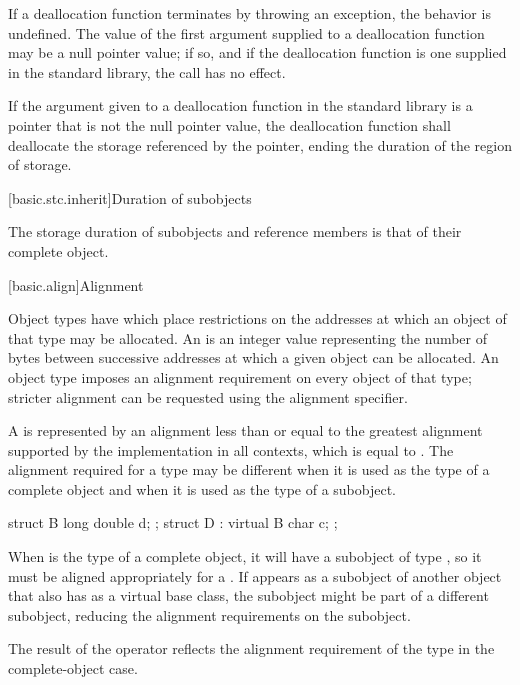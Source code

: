 \pnum
If a deallocation function terminates by throwing an exception, the behavior is undefined.
The value of the first argument supplied to a deallocation function may
be a null pointer value; if so, and if the deallocation function is one
supplied in the standard library, the call has no effect.

\pnum
If the argument given to a deallocation function in the standard library
is a pointer that is not the null pointer value, the
deallocation function shall deallocate the storage referenced by the
pointer, ending the duration of the region of storage.

[basic.stc.inherit]{Duration of subobjects}

\pnum
{}%
The storage duration of subobjects and reference members
is that of their complete object.
%

[basic.align]{Alignment}

\pnum
Object types have 
which place restrictions on the addresses at which an object of that type
may be allocated. An  is an 
integer value representing the number of bytes between successive addresses
at which a given object can be allocated. An object type imposes an alignment
requirement on every object of that type; stricter alignment can be requested
using the alignment specifier.

\pnum
A  is represented by an alignment
less than or equal to the greatest alignment supported by the implementation in
all contexts, which is equal to
.
The alignment required for a type may be different when it is used as the type
of a complete object and when it is used as the type of a subobject.
\begin{example}
\begin{codeblock}
struct B { long double d; };
struct D : virtual B { char c; };
\end{codeblock}

When  is the type of a complete object, it will have a subobject of
type , so it must be aligned appropriately for a .
If  appears as a subobject of another object that also has 
as a virtual base class, the  subobject might be part of a different
subobject, reducing the alignment requirements on the  subobject.
\end{example}
The result of the  operator reflects the alignment
requirement of the type in the complete-object case.

